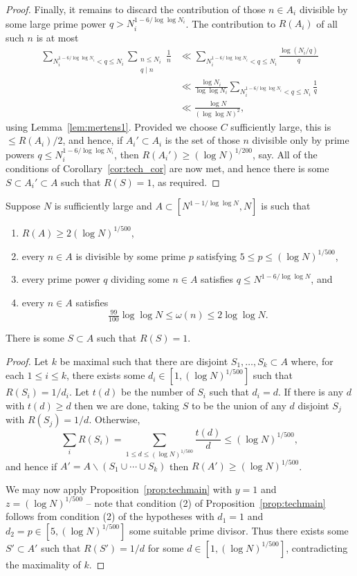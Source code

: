 \begin{proof}
  Finally, it remains to discard the contribution of those $n\in A_i$ divisible by some large prime power $q> N_i^{1-6/\log\log N_i}$. The contribution to $R(A_i)$ of all such $n$ is at most
  \begin{align*}
  \sum_{N_i^{1-6/\log\log N_i}< q\leq N_i}\sum_{\substack{n\leq N_i\\ q\mid n}}\frac{1}{n}
  &\ll \sum_{N_i^{1-6/\log\log N_i}< q\leq N_i}\frac{\log(N_i/q)}{q}\\
  &\ll \frac{\log N_i}{\log\log N_i}\sum_{N_i^{1-6/\log\log N_i}<q\leq N_i}\frac{1}{q}\\
  &\ll \frac{\log N}{(\log\log N)^2},
  \end{align*}
  using Lemma~\ref{lem:mertens1}. Provided we choose $C$ sufficiently large, this is $\leq R(A_i)/2$, and hence, if $A_i'\subset A_i$ is the set of those $n$ divisible only by prime powers $q\leq N_i^{1-6/\log\log N_i}$, then $R(A_i')\geq (\log N)^{1/200}$, say. All of the conditions of Corollary~\ref{cor:tech_cor} are now met, and hence there is some $S\subset A_i'\subset A$ such that $R(S)=1$, as required.
\end{proof}


\begin{corollary}\label{cor:tech_cor}
  \leanok
  Suppose $N$ is sufficiently large and $A\subset [N^{1-1/\log\log N},N]$ is such that
  \begin{enumerate}
  \item $R(A)\geq 2(\log N)^{1/500}$,
  \item every $n\in A$ is divisible by some prime $p$ satisfying $5 \leq p \leq (\log N)^{1/500}$,
  \item every prime power $q$ dividing some $n\in A$ satisfies $q\leq N^{1-6/\log\log N}$, and
  \item every $n\in A$ satisfies
  \[\tfrac{99}{100}\log\log N\leq \omega(n) \leq 2\log\log N.\]
  \end{enumerate}
  There is some $S\subset A$ such that $R(S)=1$.
\end{corollary}
\begin{proof}
  \leanok
  Let $k$ be maximal such that there are disjoint $S_1,\ldots,S_k\subset A$ where, for each $1\leq i\leq k$, there exists some $d_i\in [1,(\log N)^{1/500}]$ such that $R(S_i)=1/d_i$. Let $t(d)$ be the number of $S_i$ such that $d_i=d$. If there is any $d$ with $t(d)\geq d$ then we are done, taking $S$ to be the union of any $d$ disjoint $S_j$ with $R(S_j)=1/d$. Otherwise,
  \[\sum_i R(S_i)= \sum_{1\leq d\leq (\log N)^{1/500}} \frac{t(d)}{d}\leq (\log N)^{1/500},\]
  and hence if $A'=A\backslash (S_1\cup\cdots \cup S_k)$ then $R(A')\geq (\log N)^{1/500}$.

  We may now apply Proposition~\ref{prop:techmain} with $y=1$ and $z=(\log N)^{1/500}$ -- note that condition (2) of Proposition~\ref{prop:techmain} follows from condition (2) of the hypotheses with $d_1=1$ and $d_2=p\in [5,(\log N)^{1/500}]$ some suitable prime divisor. Thus there exists some $S'\subset A'$ such that $R(S')=1/d$ for some $d\in [1,(\log N)^{1/500}]$, contradicting the maximality of $k$.
\end{proof}

